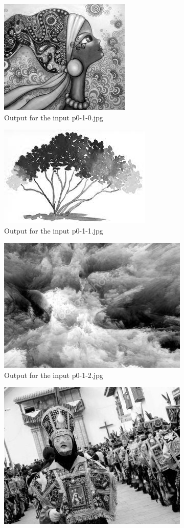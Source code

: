 \begin{enumerate}[label=\emph{\alph*)}]
\begin{figure}[h!]
\centering
\begin{subfigure}{0.5\textwidth}
  \centering
  \includegraphics[width=0.5\linewidth]{../output/p0-2-b-0.jpg}
  \caption{Output for the input p0-1-0.jpg}
  \label{fig:sfig1}
\end{subfigure}%
\begin{subfigure}{0.5\textwidth}
  \centering
  \includegraphics[width=0.5\linewidth]{../output/p0-2-b-1.jpg}
  \caption{Output for the input p0-1-1.jpg}
  \label{fig:sfig2}
\end{subfigure}
\begin{subfigure}{0.5\textwidth}
  \centering
  \includegraphics[width=0.5\linewidth]{../output/p0-2-b-2.jpg}
  \caption{Output for the input p0-1-2.jpg}
  \label{fig:sfig1}
\end{subfigure}%
\begin{subfigure}{0.5\textwidth}
  \centering
  \includegraphics[width=0.5\linewidth]{../output/p0-2-b-3.jpg}

\end{subfigure}
\end{figure}
\end{enumerate}
